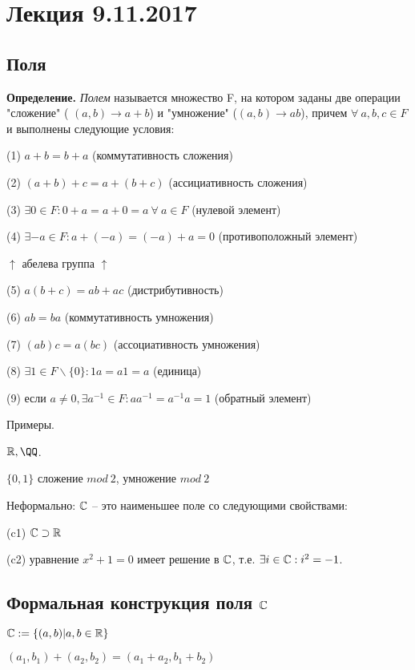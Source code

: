 \section{Лекция 9.11.2017}

\subsection{Поля}

\textbf{Определение.} \textit{Полем} называется множество F, на котором заданы две операции "сложение" ( $(a,b) \rightarrow a+b$) и "умножение" ($(a,b) \rightarrow ab$), причем $\forall \ a, b, c \in F$ и выполнены следующие условия:

(1) $a+b = b+a$ (коммутативность сложения)

(2) $(a+b)+c = a+(b+c)$ (ассициативность сложения)

(3) $\exists 0 \in F: 0 + a = a+ 0 = a \ \forall \ a \in F$ (нулевой элемент)

(4) $\exists -a \in F: a+(-a)=(-a)+a=0$ (противоположный элемент)

$\uparrow$ абелева группа $\uparrow$

(5) $a(b+c) = ab + ac$ (дистрибутивность)

(6) $ab=ba$ (коммутативность умножения)

(7) $(ab)c=a(bc)$ (ассоциативность умножения)

(8) $ \exists 1 \in F \backslash \{0\} : 1a=a1=a$ (единица)

(9) если $a \neq 0, \exists a^{-1} \in F: aa^{-1} = a^{-1} a = 1$ (обратный элемент)

\bigskip
Примеры. 

$\RR, \QQ$.

$\{0, 1\}$ сложение $mod \ 2$, умножение $mod \ 2$

\bigskip
Неформально: $\mathbb{C}$ -- это наименьшее поле со следующими свойствами:

(c1) $\mathbb{C} \supset \mathbb{R}$

(c2) уравнение $x^2 + 1 = 0$ имеет решение в $\mathbb{C}$, т.е. $\exists i \in \mathbb{C}: i^2 = -1$.

\bigskip
\subsection{Формальная конструкция поля $\mathbb{C}$}

\bigskip
$\mathbb{C} := \{(a,b) | a, b \in \mathbb{R}\}$

\bigskip
$(a_1, b_1) + (a_2, b_2) = (a_1 + a_2, b_1 + b_2)$

